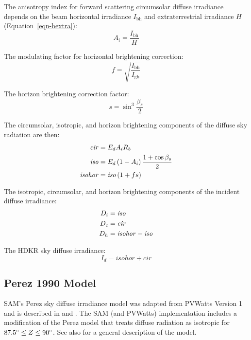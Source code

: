 \documentclass[12pt,letterpaper]{article}
\begin{document}
The anisotropy index for forward scattering circumsolar diffuse irradiance depends on the beam horizontal irradiance $I_{\mathrm{bh}}$ and extraterrestrial irradiance $H$ (Equation~\ref{eqn-hextra}):
\begin{equation}
A_i = \frac{I_{\mathrm{bh}}}{H}
\end{equation}

The modulating factor for horizontal brightening correction:
\begin{equation}
f =\sqrt{\frac{I_{\mathrm{bh}}}{I_{\mathrm{gh}}}}
\end{equation}

The horizon brightening correction factor:
\begin{equation}
s =\sin^3\frac{\beta_s}{2}
\end{equation}

The circumsolar, isotropic, and horizon brightening components of the diffuse sky radiation are then:
\begin{align}
\mathit{cir} &= E_d A_i R_b \notag\\
\mathit{iso} &= E_d \left( 1 - A_i \right) \frac{1 + \cos \beta_s}{2} \notag\\
\mathit{isohor} &= \mathit{iso} \left( 1 + f s \right)
\end{align}

The isotropic, circumsolar, and horizon brightening components of the incident diffuse irradiance:
\begin{align}
D_i &= \mathit{iso} \notag\\
D_c &= \mathit{cir} \notag\\
D_h &= \mathit{isohor} - \mathit{iso}
\end{align}

The HDKR sky diffuse irradiance:
\begin{equation}
I_d = \mathit{isohor} + \mathit{cir}
\end{equation}

\subsection{Perez 1990 Model}\label{sec-perez}

SAM's Perez sky diffuse irradiance model was adapted from PVWatts Version 1 \citep{dobos2013a} and is described in \citet{perez1988} and \citep{perez1990}. The SAM (and PVWatts) implementation includes a modification of the Perez model that treats diffuse radiation as isotropic for $87.5\degree \leq Z \leq 90\degree$. See also \citep{pvmcperez} for a general description of the model.
\end{document}
